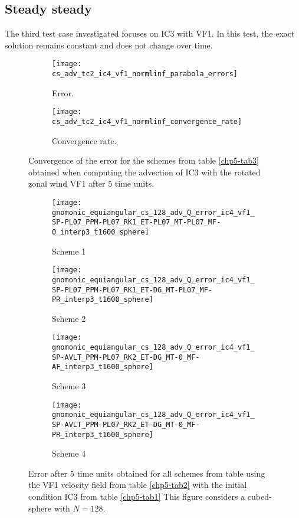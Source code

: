 \subsection{Steady steady}
The third test case investigated focuses on IC3 with VF1. In this test, the exact solution 
remains constant and does not change over time. 

\begin{figure}[!htb]
	\centering
	\begin{subfigure}{0.42\textwidth}
		\centering
		\texttt{[image: cs\_adv\_tc2\_ic4\_vf1\_normlinf\_parabola\_errors]}
		\caption{Error.\label{chp5-adv2-error}}
	\end{subfigure}
	\begin{subfigure}{0.42\textwidth}
		\centering
		\texttt{[image: cs\_adv\_tc2\_ic4\_vf1\_normlinf\_convergence\_rate]}
		\caption{Convergence rate.\label{chp5-adv2-cr}}
	\end{subfigure}
	\caption{Convergence of the error for the schemes from table \ref{chp5-tab3} obtained when computing the advection of IC3  with the rotated zonal wind VF1 after 5 time units.
	\label{chp5-error-adv2}}
\end{figure}


\begin{figure}[!htb]
	\centering
	\begin{subfigure}{0.35\textwidth}
		\centering
		\texttt{[image: gnomonic\_equiangular\_cs\_128\_adv\_Q\_error\_ic4\_vf1\_SP-PL07\_PPM-PL07\_RK1\_ET-PL07\_MT-PL07\_MF-0\_interp3\_t1600\_sphere]}
		\caption{Scheme 1 \label{chp5-adv2-s1}}
	\end{subfigure}
	\begin{subfigure}{0.35\textwidth}
		\centering
		\texttt{[image: gnomonic\_equiangular\_cs\_128\_adv\_Q\_error\_ic4\_vf1\_SP-PL07\_PPM-PL07\_RK1\_ET-DG\_MT-PL07\_MF-PR\_interp3\_t1600\_sphere]}
		\caption{Scheme 2 \label{chp5-adv2-s2}}
	\end{subfigure}
	
	\begin{subfigure}{0.35\textwidth}
		\centering
		\texttt{[image: gnomonic\_equiangular\_cs\_128\_adv\_Q\_error\_ic4\_vf1\_SP-AVLT\_PPM-PL07\_RK2\_ET-DG\_MT-0\_MF-AF\_interp3\_t1600\_sphere]}
		\caption{Scheme 3 \label{chp5-adv2-s3}}
	\end{subfigure}
	\begin{subfigure}{0.35\textwidth}
		\centering
		\texttt{[image: gnomonic\_equiangular\_cs\_128\_adv\_Q\_error\_ic4\_vf1\_SP-AVLT\_PPM-PL07\_RK2\_ET-DG\_MT-0\_MF-PR\_interp3\_t1600\_sphere]}
		\caption{Scheme 4 \label{chp5-adv2-s4}}
	\end{subfigure}
	\caption{ Error after 5 time units obtained for all schemes from table using the VF1 velocity field from table \ref{chp5-tab2} with the initial condition IC3 from  table \ref{chp5-tab1} 
		This figure considers a cubed-sphere with $N=128$. \label{chp5-adv2}}
\end{figure}

